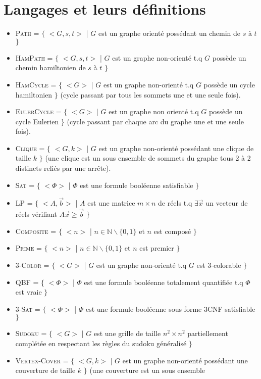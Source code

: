 \documentclass[a4paper,11pt]{report}
\newcommand{\languageDef}[3]{\textsc{#1} = $\{$ #2 | #3 $\}$}
\begin{document}
\section{Langages et leurs définitions}
\begin{itemize}
\item \languageDef{Path}{$<G,s,t>$}{$G$ est un graphe orienté possédant un chemin de $s$ à $t$}
\item \languageDef{HamPath}{$<G,s,t>$}{$G$ est un graphe non-orienté t.q $G$ possède un chemin hamiltonien de $s$ à $t$}
\item \languageDef{HamCycle}{$<G>$}{$G$ est un graphe non-orienté t.q $G$ 
possède un cycle hamiltonien} (cycle passant par tous les sommets une et une 
seule fois).
\item \languageDef{EulerCycle}{$<G>$}{$G$ est un graphe non orienté t.q $G$ 
possède un cycle Eulerien} (cycle passant par chaque arc du graphe une et une 
seule fois).
\item \languageDef{Clique}{$<G,k>$}{$G$ est un graphe non-orienté possédant 
une clique de taille $k$} (une clique est un sous ensemble de sommets du 
graphe tous 2 à 2 distincts reliés par une arrête).
\item \languageDef{Sat}{$<\Phi>$}{$\Phi$ est une formule booléenne satisfiable}
\item \languageDef{LP}{$<A,\overset{\rightarrow}{b}>$}{$A$ est une matrice $m \times n$ de réels t.q $\exists \overset{\rightarrow}{x}$ un vecteur de réels vérifiant $A\overset{\rightarrow}{x} \ge \overset{\rightarrow}{b}$}
\item \languageDef{Composite}{$<n>$}{$n \in \mathbb{N} \backslash \{0,1\}$ et $n$ est composé}
\item \languageDef{Prime}{$<n>$}{$n \in \mathbb{N} \backslash \{0,1\}$ et $n$ est premier}
\item \languageDef{3-Color}{$<G>$}{$G$ est un graphe non-orienté t.q $G$ est 3-colorable}
\item \languageDef{QBF}{$<\Phi>$}{$\Phi$ est une formule booléenne totalement quantifiée t.q $\Phi$ est vraie}
\item \languageDef{3-Sat}{$<\Phi>$}{$\Phi$ est une formule booléenne sous forme 3CNF satisfiable}
\item \languageDef{Sudoku}{$<G>$}{$G$ est une grille de taille $n^2 \times n^2$ partiellement complétée en respectant les règles du sudoku généralisé}
\item \languageDef{Vertex-Cover}{$<G,k>$}{$G$ est un graphe non-orienté possédant une couverture de taille $k$} (une couverture est un sous ensemble

\end{itemize}
\end{document}
